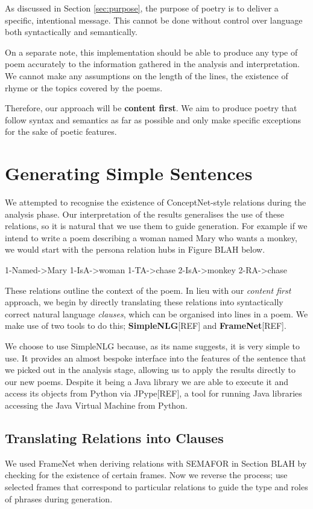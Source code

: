 As discussed in Section \ref{sec:purpose}, the purpose of poetry is to deliver a specific, intentional message. This cannot be done without control over language both syntactically and semantically.

On a separate note, this implementation should be able to produce any type of poem accurately to the information gathered in the analysis and interpretation. We cannot make any assumptions on the length of the lines, the existence of rhyme or the topics covered by the poems.

Therefore, our approach will be \textbf{content first}. We aim to produce poetry that follow syntax and semantics as far as possible and only make specific exceptions for the sake of poetic features.


\section{Generating Simple Sentences}
\label{sec:build}
We attempted to recognise the existence of ConceptNet-style relations during the analysis phase. Our interpretation of the results generalises the use of these relations, so it is natural that we use them to guide generation. For example if we intend to write a poem describing a woman named Mary who wants a monkey, we would start with the persona relation hubs in Figure BLAH below.

1-Named->Mary
1-IsA->woman
1-TA->chase
2-IsA->monkey
2-RA->chase

These relations outline the context of the poem. In lieu with our \textit{content first} approach, we begin by directly translating these relations into syntactically correct natural language \textit{clauses}, which can be organised into lines in a poem. We make use of two tools to do this; \textbf{SimpleNLG}[REF] and \textbf{FrameNet}[REF].

We choose to use SimpleNLG because, as its name suggests, it is very simple to use. It provides an almost bespoke interface into the features of the sentence that we picked out in the analysis stage, allowing us to apply the results directly to our new poems. Despite it being a Java library we are able to execute it and access its objects from Python via JPype[REF], a tool for running Java libraries accessing the Java Virtual Machine from Python.

\subsection{Translating Relations into Clauses}
We used FrameNet when deriving relations with SEMAFOR in Section BLAH by checking for the existence of certain frames. Now we reverse the process; use selected frames that correspond to particular relations to guide the type and roles of phrases during generation.

